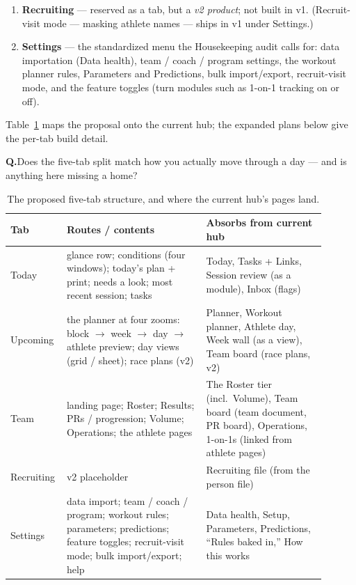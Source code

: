 \documentclass[11pt]{article}
\newcommand{\question}[1]{\par\vspace{4pt}%
  \noindent\colorbox{kailosoft}{\parbox{\dimexpr\linewidth-2\fboxsep}{%
  \small\textcolor{kailoaccent}{\textbf{Q.}}\;#1}}\par\vspace{3pt}}
\begin{document}
\begin{enumerate}
    The athlete page is deliberately \emph{not} a top-level tab: the routes
    converge on it (Figure~\ref{fig:teamflow}), so a coach reaches the same
    athlete object whether they come through the roster, the boards, or a
    result.
  \item \textbf{Recruiting} --- reserved as a tab, but a \emph{v2 product};
    not built in v1. (Recruit-visit mode --- masking athlete names --- ships
    in v1 under Settings.)
  \item \textbf{Settings} --- the standardized menu the Housekeeping audit
    calls for: data importation (Data health), team / coach / program
    settings, the workout planner rules, Parameters and Predictions, bulk
    import/export, recruit-visit mode, and the feature toggles (turn modules
    such as 1-on-1 tracking on or off).
\end{enumerate}

Table~\ref{tab:proposal} maps the proposal onto the current hub; the expanded
plans below give the per-tab build detail.

\question{Does the five-tab split match how you actually move through a day
--- and is anything here missing a home?}

\begin{table}[h]
\centering\small
\begin{tabular}{@{}p{0.12\linewidth}p{0.42\linewidth}p{0.36\linewidth}@{}}
\toprule
\textbf{Tab} & \textbf{Routes / contents} & \textbf{Absorbs from current hub}\\
\midrule
Today & glance row; conditions (four windows); today's plan + print; needs a
  look; most recent session; tasks &
  Today, Tasks + Links, Session review (as a module), Inbox (flags)\\[3pt]
Upcoming & the planner at four zooms: block $\to$ week $\to$ day $\to$
  athlete preview; day views (grid / sheet); race plans (v2) &
  Planner, Workout planner, Athlete day, Week wall (as a view), Team board
  (race plans, v2)\\[3pt]
Team & landing page; Roster; Results; PRs / progression; Volume;
  Operations; the athlete pages &
  The Roster tier (incl.\ Volume), Team board (team document, PR board),
  Operations, 1-on-1s (linked from athlete pages)\\[3pt]
Recruiting & v2 placeholder &
  Recruiting file (from the person file)\\[3pt]
Settings & data import; team / coach / program; workout rules; parameters;
  predictions; feature toggles; recruit-visit mode; bulk import/export; help &
  Data health, Setup, Parameters, Predictions, ``Rules baked in,'' How this
  works\\
\bottomrule
\end{tabular}
\caption{The proposed five-tab structure, and where the current hub's pages
land.}
\label{tab:proposal}
\end{table}
\end{document}
